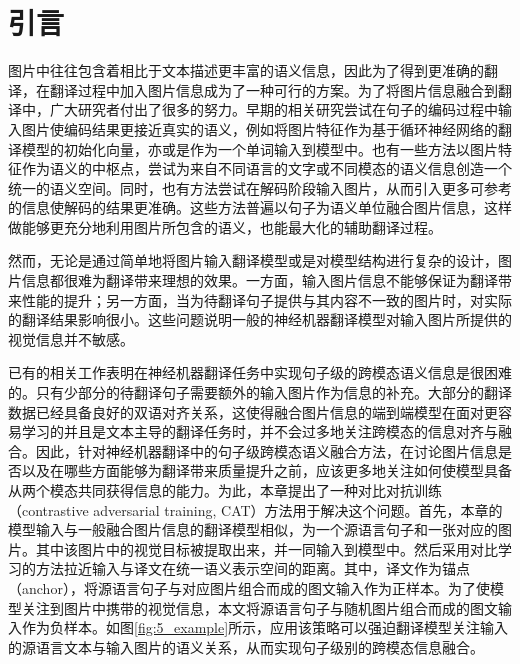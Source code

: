 \section{引言}
图片中往往包含着相比于文本描述更丰富的语义信息，因此为了得到更准确的翻译，在翻译过程中加入图片信息成为了一种可行的方案。为了将图片信息融合到翻译中，广大研究者付出了很多的努力。早期的相关研究尝试在句子的编码过程中输入图片使编码结果更接近真实的语义，例如将图片特征作为基于循环神经网络的翻译模型的初始化向量，亦或是作为一个单词输入到模型中。也有一些方法以图片特征作为语义的中枢点，尝试为来自不同语言的文字或不同模态的语义信息创造一个统一的语义空间。同时，也有方法尝试在解码阶段输入图片，从而引入更多可参考的信息使解码的结果更准确。这些方法普遍以句子为语义单位融合图片信息，这样做能够更充分地利用图片所包含的语义，也能最大化的辅助翻译过程。

然而，无论是通过简单地将图片输入翻译模型或是对模型结构进行复杂的设计，图片信息都很难为翻译带来理想的效果。一方面，输入图片信息不能够保证为翻译带来性能的提升；另一方面，当为待翻译句子提供与其内容不一致的图片时，对实际的翻译结果影响很小。这些问题说明一般的神经机器翻译模型对输入图片所提供的视觉信息并不敏感。


已有的相关工作表明在神经机器翻译任务中实现句子级的跨模态语义信息是很困难的。只有少部分的待翻译句子需要额外的输入图片作为信息的补充。大部分的翻译数据已经具备良好的双语对齐关系，这使得融合图片信息的端到端模型在面对更容易学习的并且是文本主导的翻译任务时，并不会过多地关注跨模态的信息对齐与融合。因此，针对神经机器翻译中的句子级跨模态语义融合方法，在讨论图片信息是否以及在哪些方面能够为翻译带来质量提升之前，应该更多地关注如何使模型具备从两个模态共同获得信息的能力。为此，本章提出了一种对比对抗训练（contrastive adversarial training, CAT）方法用于解决这个问题。首先，本章的模型输入与一般融合图片信息的翻译模型相似，为一个源语言句子和一张对应的图片。其中该图片中的视觉目标被提取出来，并一同输入到模型中。然后采用对比学习的方法拉近输入与译文在统一语义表示空间的距离。其中，译文作为锚点（anchor），将源语言句子与对应图片组合而成的图文输入作为正样本。为了使模型关注到图片中携带的视觉信息，本文将源语言句子与随机图片组合而成的图文输入作为负样本。如图\ref{fig:5_example}所示，应用该策略可以强迫翻译模型关注输入的源语言文本与输入图片的语义关系，从而实现句子级别的跨模态信息融合。

